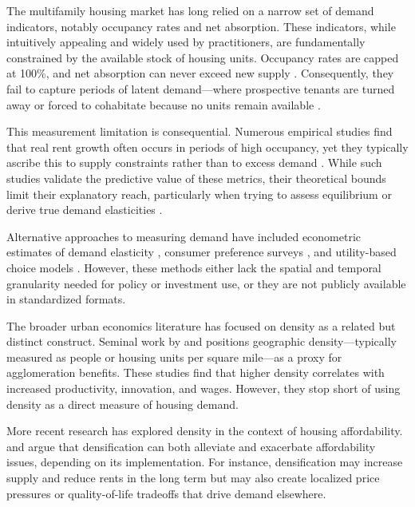 \documentclass[sn-mathphys-num]{sn-jnl}%
\theoremstyle{thmstyleone}%
\theoremstyle{thmstyletwo}%
\theoremstyle{thmstylethree}%
\begin{document}
The multifamily housing market has long relied on a narrow set of demand indicators, notably occupancy rates and net absorption. These indicators, while intuitively appealing and widely used by practitioners, are fundamentally constrained by the available stock of housing units. Occupancy rates are capped at 100\%, and net absorption can never exceed new supply \citep{mueller1999real, gabriel2001rental}. Consequently, they fail to capture periods of latent demand---where prospective tenants are turned away or forced to cohabitate because no units remain available \citep{sirmans1991determinants, pyhrr1999real}.

This measurement limitation is consequential. Numerous empirical studies find that real rent growth often occurs in periods of high occupancy, yet they typically ascribe this to supply constraints rather than to excess demand \citep{goodman1992rental, wheaton1991realestate}. While such studies validate the predictive value of these metrics, their theoretical bounds limit their explanatory reach, particularly when trying to assess equilibrium or derive true demand elasticities \citep{pennington2021does, molloy2022housing}.

Alternative approaches to measuring demand have included econometric estimates of demand elasticity \citep{green2002measuring}, consumer preference surveys \citep{malpezzi1996rent}, and utility-based choice models \citep{rosenthal1997housing}. However, these methods either lack the spatial and temporal granularity needed for policy or investment use, or they are not publicly available in standardized formats.

The broader urban economics literature has focused on density as a related but distinct construct. Seminal work by \citet{glaeser2001cities} and \citet{duranton2004micro} positions geographic density---typically measured as people or housing units per square mile---as a proxy for agglomeration benefits. These studies find that higher density correlates with increased productivity, innovation, and wages. However, they stop short of using density as a direct measure of housing demand.

More recent research has explored density in the context of housing affordability. \citet{ahlfeldt2019economic} and \citet{albouy2015driving} argue that densification can both alleviate and exacerbate affordability issues, depending on its implementation. For instance, densification may increase supply and reduce rents in the long term but may also create localized price pressures or quality-of-life tradeoffs that drive demand elsewhere.
\end{document}
